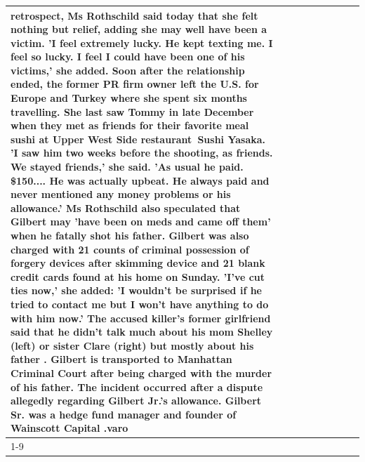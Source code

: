 \begin{table}[H]
\begin{tabular}{lllrlllll}
retrospect, Ms Rothschild said today that she felt nothing but relief, adding she may well have been a victim. 'I feel extremely lucky. He kept texting me. I feel so lucky. I feel I could have been one of his victims,' she added. Soon after the relationship ended, the former PR firm owner left the U.S. for Europe and Turkey where she spent six months  travelling. She last saw Tommy in late December when they met as friends for their favorite meal sushi at Upper West Side restaurant Sushi Yasaka. 'I saw him two weeks before the shooting, as friends. We stayed friends,' she said. 'As usual he paid. \$150.... He was actually upbeat. He always paid and never mentioned any money problems or his allowance.' Ms Rothschild also speculated that Gilbert may 'have been on meds and came off them' when he fatally shot his father. Gilbert was also charged with 21 counts of criminal possession of forgery devices after skimming device and 21 blank credit cards found at his home on Sunday. 'I've cut ties now,' she added: 'I wouldn’t be surprised if he tried to contact me but I won’t have anything to do with him now.' The accused killer's former girlfriend said that he didn't talk much about his mom Shelley (left) or sister Clare (right) but mostly about his father . Gilbert is transported to Manhattan Criminal Court  after being charged with the murder of his father. The incident occurred after a dispute allegedly regarding Gilbert Jr.'s allowance. Gilbert Sr. was a hedge fund manager and founder of Wainscott Capital .varo \\
\cline{1-9} \cline{2-9}

\end{tabular}
\end{table}
